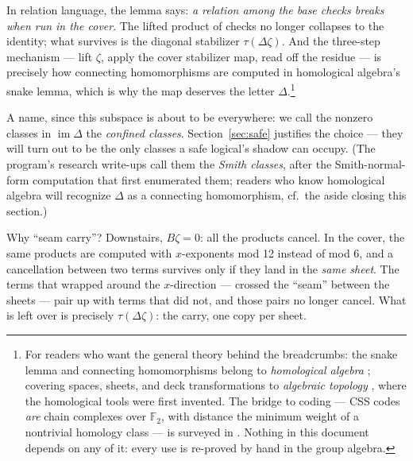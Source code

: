 \documentclass[11pt]{article}
\theoremstyle{plain}
\theoremstyle{definition}
\theoremstyle{remark}
\newcommand{\F}{\mathbb{F}}
\newcommand{\imD}{\operatorname{im}\Delta}
\begin{document}
In relation language, the lemma says: \emph{a relation among the base checks
breaks when run in the cover}. The lifted product of checks no longer
collapses to the identity; what survives is the diagonal stabilizer
$\tau(\Delta\zeta)$. And the three-step mechanism --- lift $\zeta$, apply
the cover stabilizer map, read off the residue --- is precisely how
connecting homomorphisms are computed in homological algebra's snake lemma,
which is why the map deserves the letter $\Delta$.\footnote{For readers who
want the general theory behind the breadcrumbs: the snake lemma and
connecting homomorphisms belong to \emph{homological algebra}
\cite{weibel}; covering spaces, sheets, and deck transformations to
\emph{algebraic topology} \cite{hatcher}, where the homological tools were
first invented. The bridge to coding --- CSS codes \emph{are} chain
complexes over $\F_2$, with distance the minimum weight of a nontrivial
homology class --- is surveyed in \cite{breuckmann}. Nothing in this
document depends on any of it: every use is re-proved by hand in the group
algebra.}

A name, since this subspace is about to be everywhere: we call the nonzero
classes in $\imD$ the \emph{confined classes}. Section~\ref{sec:safe}
justifies the choice --- they will turn out to be the only classes a safe
logical's shadow can occupy. (The program's research write-ups call them the
\emph{Smith classes}, after the Smith-normal-form computation that first
enumerated them; readers who know homological algebra will recognize
$\Delta$ as a connecting homomorphism, cf.\ the aside closing this section.)

Why ``seam carry''? Downstairs, $B\zeta = 0$: all the products cancel. In the
cover, the same products are computed with $x$-exponents mod 12 instead of mod
6, and a cancellation between two terms survives only if they land in the
\emph{same sheet}. The terms that wrapped around the $x$-direction --- crossed
the ``seam'' between the sheets --- pair up with terms that did not, and those
pairs no longer cancel. What is left over is precisely $\tau(\Delta\zeta)$:
the carry, one copy per sheet.
\end{document}
